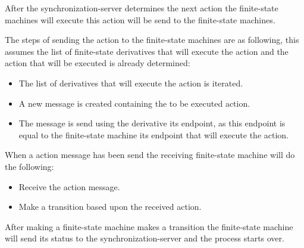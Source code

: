After the synchronization-server determines the next action the
finite-state machines will execute this action will be send to the
finite-state machines.

The steps of sending the action to the finite-state machines are as
following, this assumes the list of finite-state derivatives that will
execute the action and the action that will be executed is already
determined:

\begin{itemize}
\tightlist
\item
  The list of derivatives that will execute the action is iterated.
\item
  A new message is created containing the to be executed action.
\item
  The message is send using the derivative its endpoint, as this
  endpoint is equal to the finite-state machine its endpoint that will
  execute the action.
\end{itemize}

When a action message has been send the receiving finite-state machine
will do the following:

\begin{itemize}
\tightlist
\item
  Receive the action message.
\item
  Make a transition based upon the received action.
\end{itemize}

After making a finite-state machine makes a transition the finite-state
machine will send its status to the synchronization-server and the
process starts over.
